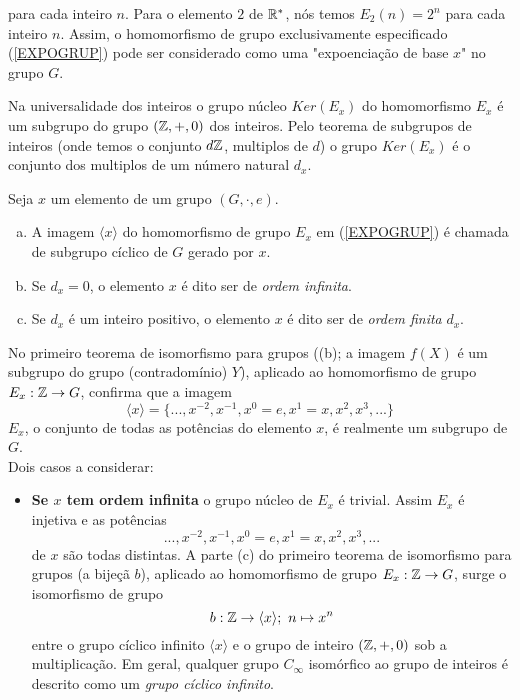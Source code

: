 \begin{definition}[Magma]
\begin{exmp}[Exponenciação]
         para cada inteiro $n$. Para o elemento $2$ de $\mathbb{R}^{*}$, nós temos $E_{2}(n) = 2^{n}$ para cada inteiro $n$. Assim, o homomorfismo de grupo exclusivamente especificado (\ref{EXPOGRUP}) pode ser considerado como uma "expoenciação de base $x$" no grupo $G$.
      \end{exmp}
      Na universalidade dos inteiros o grupo núcleo $Ker(E_{x})$ do homomorfismo $E_{x}$ é um subgrupo do grupo $(\mathbb{Z}, +, 0)$ dos inteiros. Pelo teorema de subgrupos de inteiros (onde temos o conjunto $d\mathbb{Z}$, multiplos de $d$) o grupo $Ker(E_{x})$ é o conjunto dos multiplos de um número natural $d_{x}$.
      \begin{definition}
         Seja $x$ um elemento de um grupo $(G,\cdot,e)$.
         \begin{enumerate}[(a)]
            \item A imagem $\langle x \rangle$ do homomorfismo de grupo $E_{x}$ em (\ref{EXPOGRUP}) é chamada de subgrupo cíclico de $G$ gerado por $x$.
            \item Se $d_{x} = 0$, o elemento $x$ é dito ser de \emph{ordem infinita}.
            \item Se $d_{x}$ é um inteiro positivo, o elemento $x$ é dito ser de \emph{ordem finita} $d_{x}$.
         \end{enumerate}
      \end{definition}
      No primeiro teorema de isomorfismo para grupos ((b); a imagem $f(X)$ é um subgrupo do grupo (contradomínio) $Y$), aplicado ao homomorfismo de grupo $E_{x}: \mathbb{Z} \to G$, confirma que a imagem
      $$ \langle x \rangle = \{..., x^{-2} , x^{-1} , x^{0} = e, x^{1} = x, x^{2} , x^{3} , ...\}$$
      $E_{x}$, o conjunto de todas as potências do elemento $x$, é realmente um subgrupo de $G$.\\
      Dois casos a considerar:
      \begin{itemize}
         \item \textbf{Se $x$ tem ordem infinita} o grupo núcleo de $E_{x}$ é trivial. Assim $E_{x}$ é injetiva e as potências $$... , x^{-2} , x^{-1} , x^{0} = e , x^{1} = x , x^{2} , x^{3} , ... $$ de $x$ são todas distintas. A parte (c) do primeiro teorema de isomorfismo para grupos (a bijeçã $b$), aplicado ao homomorfismo de grupo $E_{x}: \mathbb{Z} \to G$, surge o isomorfismo de grupo $$b:\mathbb{Z} \to \langle x \rangle ;\ n \mapsto x^{n}$$ entre o grupo cíclico infinito $\langle x \rangle$ e o grupo de inteiro $(\mathbb{Z}, +, 0)$ sob a multiplicação. Em geral, qualquer grupo $C_{\infty}$ isomórfico ao grupo de inteiros é descrito como um \emph{grupo cíclico infinito}.

\end{itemize}
\end{definition}
